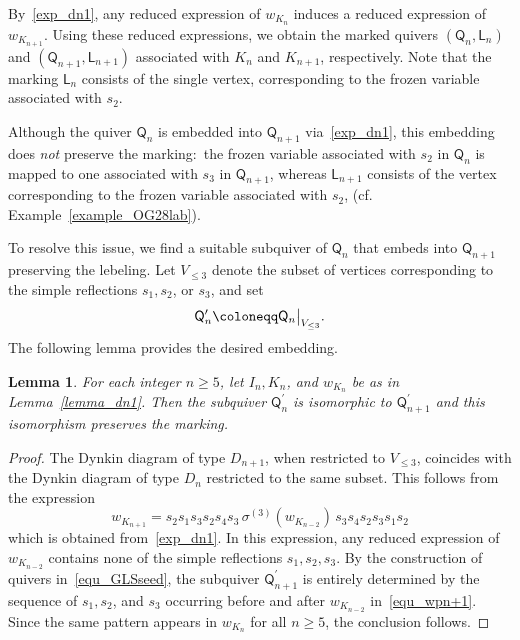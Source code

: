 \documentclass[11pt]{amsart}
\numberwithin{equation}{section}
\theoremstyle{plain}
\newtheorem{lemma}[theorem]{Lemma}
\theoremstyle{definition}
\numberwithin{equation}{section}
\begin{document}
By~\eqref{exp_dn1}, any reduced expression of $w_{K_{n}}$ induces a reduced expression of $w_{K_{n+1}}$. Using these reduced expressions, we obtain the marked quivers  $(\mathsf{Q}_n, \mathsf{L}_n)$ and $(\mathsf{Q}_{n+1}, \mathsf{L}_{n+1})$ associated with $K_{n}$ and $K_{n+1}$, respectively. Note that the marking $\mathsf{L}_n$ consists of the single vertex, corresponding to the frozen variable associated with $s_{2}$. 

Although the quiver $\mathsf{Q}_n$ is embedded into $\mathsf{Q}_{n+1}$ via~\eqref{exp_dn1}, this embedding does \emph{not} preserve the marking$\colon$ the frozen variable associated with $s_{2}$ in $\mathsf{Q}_n$ is mapped to one associated with $s_{3}$ in $\mathsf{Q}_{n+1}$, whereas $\mathsf{L}_{n+1}$ consists of the vertex  corresponding to the frozen variable associated with $s_{2}$, (cf. Example~\ref{example_OG28lab}).

To resolve this issue, we find a suitable subquiver of $\mathsf{Q}_n$ that embeds into $\mathsf{Q}_{n+1}$ preserving the lebeling. Let $V_{\leq 3}$ denote the subset of vertices corresponding to the simple reflections $s_{1}, s_{{2}}$, or $s_{{3}}$, and set
$$
\mathsf{Q}_n^\prime \coloneqq \mathsf{Q}_n \big{|}_{V_{\leq 3}}.
$$
The following lemma provides the desired embedding.

\begin{lemma}\label{lemma_dn2}
For each integer $n \geq 5$, let $I_n, K_n$, and $w_{K_n}$ be as in Lemma~\ref{lemma_dn1}. Then the subquiver $\mathsf{Q}_n^\prime$ is isomorphic to $\mathsf{Q}^\prime_{n+1}$ and this isomorphism preserves the marking.
\end{lemma}

\begin{proof}
The Dynkin diagram of type $D_{n+1}$, when restricted to $V_{\leq 3}$, coincides with the Dynkin diagram of type $D_{n}$ restricted to the same subset. This follows from the expression
\begin{equation}\label{equ_wpn+1}
w_{K_{n+1}} =  s_{2} s_{1} s_{3} s_{2}  s_{4} s_{3} \, \sigma^{(3)} (w_{K_{n-2}}) \, s_{3}  s_{4} s_{2}  s_{3} s_{1} s_{2}
\end{equation}
which is obtained from~\eqref{exp_dn1}. In this expression, any reduced expression of $w_{K_{n-2}}$ contains none of the simple reflections $s_{1}, s_2, s_{3}$. By the construction of quivers in~\eqref{equ_GLSseed}, the subquiver $\mathsf{Q}^\prime_{n+1}$ is entirely determined by the sequence of $s_{1}, s_2$, and $s_{3}$ occurring before and after $w_{K_{n-2}}$ in~\eqref{equ_wpn+1}. Since the same pattern appears in $w_{K_n}$ for all $n \geq 5$, the conclusion follows. 
\end{proof}
\end{document}
